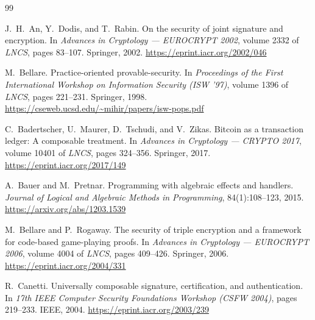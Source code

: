 \documentclass[10pt,oneside,openany]{book}
\makeatletter
\newcommand{\nav@headtext}{}
\newcommand{\chapterheadstar}[1]{\gdef\nav@headtext{#1}}
\theoremstyle{accentdef}
\theoremstyle{accentplain}
\makeatother
\begin{document}
\cleardoublepage
{}
{}
\begin{thebibliography}{99}
\chapterheadstar{Bibliography}

J.~H.~An, Y.~Dodis, and T.~Rabin.
\newblock On the security of joint signature and encryption.
\newblock In \emph{Advances in Cryptology --- EUROCRYPT 2002}, volume 2332 of \emph{LNCS}, pages
83--107. Springer, 2002.
\newblock \url{https://eprint.iacr.org/2002/046}

M.~Bellare.
\newblock Practice-oriented provable-security.
\newblock In \emph{Proceedings of the First International Workshop on Information Security (ISW
'97)}, volume 1396 of \emph{LNCS}, pages 221--231. Springer, 1998.
\newblock \url{https://cseweb.ucsd.edu/~mihir/papers/isw-pops.pdf}

C.~Badertscher, U.~Maurer, D.~Tschudi, and V.~Zikas.
\newblock Bitcoin as a transaction ledger: A composable treatment.
\newblock In \emph{Advances in Cryptology --- CRYPTO 2017}, volume 10401 of \emph{LNCS}, pages
324--356. Springer, 2017.
\newblock \url{https://eprint.iacr.org/2017/149}

A.~Bauer and M.~Pretnar.
\newblock Programming with algebraic effects and handlers.
\newblock \emph{Journal of Logical and Algebraic Methods in Programming}, 84(1):108--123, 2015.
\newblock \url{https://arxiv.org/abs/1203.1539}

M.~Bellare and P.~Rogaway.
\newblock The security of triple encryption and a framework for code-based game-playing proofs.
\newblock In \emph{Advances in Cryptology --- EUROCRYPT 2006}, volume 4004 of \emph{LNCS}, pages
409--426. Springer, 2006.
\newblock \url{https://eprint.iacr.org/2004/331}

R.~Canetti.
\newblock Universally composable signature, certification, and authentication.
\newblock In \emph{17th IEEE Computer Security Foundations Workshop (CSFW 2004)}, pages 219--233.
IEEE, 2004.
\newblock \url{https://eprint.iacr.org/2003/239}


\end{thebibliography}
\end{document}
